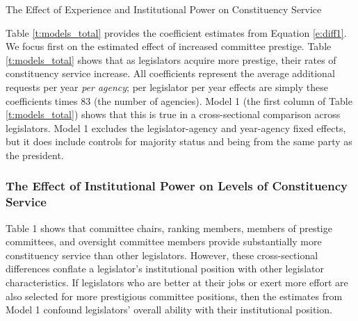 \documentclass[12pt]{article}
\begin{document}
{\begin{table}[hbt!]
\caption{The Effect of Experience and Institutional Power on Constituency Service} \label{t:models_total}
\begin{minipage}{\textwidth}
\begin{center}
\end{center}
\end{minipage}
\end{table}

Table \ref{t:models_total} provides the coefficient estimates from Equation \ref{e:diff1}. We focus first on the estimated effect of increased committee prestige. Table \ref{t:models_total} shows that as legislators acquire more prestige, their rates of constituency service increase. All coefficients represent the average additional requests per year \textit{per agency}; per legislator per year effects are simply these coefficients times 83 (the number of agencies).
Model 1 (the first column of Table \ref{t:models_total}) shows that this is true in a cross-sectional comparison across legislators. Model 1 excludes the legislator-agency and year-agency fixed effects, but it does include controls for majority status and being from the same party as the president. 

\subsubsection{The Effect of Institutional Power on Levels of Constituency Service}\label{s:prestigeresults} 

Table 1 shows that committee chairs, ranking members, members of prestige committees, and oversight committee members provide substantially more constituency service than other legislators. However, these cross-sectional differences conflate a legislator's institutional position with other legislator characteristics. If legislators who are better at their jobs or exert more effort are also selected for more prestigious committee positions, then the estimates from Model 1 confound legislators' overall ability with their institutional position.   


}
\end{document}
